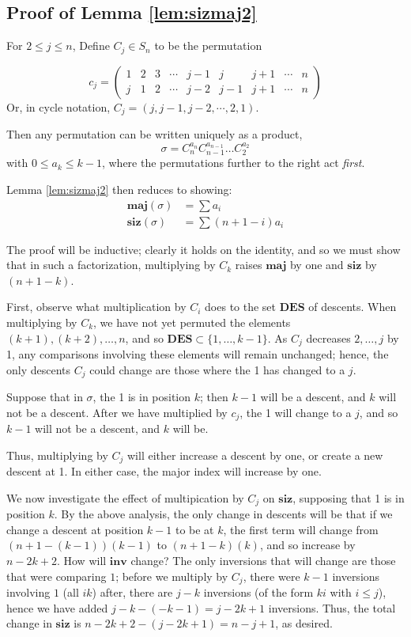 \documentclass{amsart}[12pt]
\theoremstyle{definition}
\newcommand{\inv}{\mathbf{inv}}
\newcommand{\DES}{\mathbf{DES}}
\newcommand{\maj}{\mathbf{maj}}
\newcommand{\siz}{\mathbf{siz}}
\begin{document}
\subsection{Proof of Lemma \ref{lem:sizmaj2}}

For $2\leq j\leq n$, Define $C_j\in S_n$ to be the permutation 

$$c_j=\begin{pmatrix} 
1 & 2 & 3 & \cdots & j-1 & j & j+1 & \cdots & n \\
j & 1 & 2 & \cdots & j-2 & j-1 & j+1 & \cdots & n
\end{pmatrix}$$
Or, in cycle notation, $C_j=(j,j-1,j-2,\cdots, 2,1)$.

Then any permutation can be written uniquely as a product,
$$\sigma=C_n^{a_n}C_{n-1}^{a_{n-1}}\dots C_2^{a_2}$$
with $0\leq a_k \leq k-1$, where the permutations further to the right act \emph{first}.

Lemma \ref{lem:sizmaj2} then reduces to showing:
\begin{align*}
\maj(\sigma)&=\sum a_i \\
\siz(\sigma)&=\sum (n+1-i) a_i
\end{align*}

The proof will be inductive;  clearly it holds on the identity, and so we must show that in such a factorization, multiplying by $C_k$ raises $\maj$ by one and $\siz$ by $(n+1-k)$.

First, observe what multiplication by $C_i$ does to the set $\DES$ of descents.  When multiplying by $C_k$, we have not yet permuted the elements $(k+1), (k+2),\dots, n$, and so $\DES\subset \{1,\dots, k-1\}$. As $C_j$ decreases $2,\dots, j$ by 1, any comparisons involving these elements will remain unchanged; hence, the only descents $C_j$ could change are those where the 1 has changed to a $j$.

Suppose that in $\sigma$, the 1 is in position $k$; then $k-1$ will be a descent, and $k$ will not be a descent.  After we have multiplied by $c_j$, the 1 will change to a $j$, and so $k-1$ will not be a descent, and $k$ will be.

Thus, multiplying by $C_j$ will either increase a descent by one, or create a new descent at 1.  In either case, the major index will 
increase by one.

We now investigate the effect of multipication by $C_j$ on $\siz$, supposing that 1 is in position $k$.  By the above analysis, the only change in descents will be that  if we change a descent at position $k-1$ to be at $k$, the first term will change from $(n+1-(k-1))(k-1)$ to $(n+1-k)(k)$, and so increase by $n-2k+2$.  How will $\inv$ change?  The only inversions that will change are those that were comparing $1$; before we multiply by $C_j$, there were $k-1$ inversions involving $1$ (all $ik$) after, there are $j-k$ inversions (of the form $ki$ with $i\leq j$), hence we have added $j-k-(-k-1)=j-2k+1$ inversions.  Thus, the total change in $\siz$ is $n-2k+2-(j-2k+1)=n-j+1$, as desired.
\end{document}
